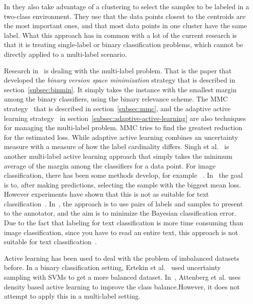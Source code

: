 In \cite{nguyen2004active} they also take advantage of a clustering to select the samples to be labeled in a two-class environment.
They use that the data points closest to the centroids are the most important ones, and that most data points in one cluster have the same label.
What this approach has in common with a lot of the current research is that it is treating single-label or binary classification problems, which cannot be directly applied to a multi-label scenario.

Research in~\cite{brinker2006active} is dealing with the multi-label problem.
That is the paper that developed the \textit{binary version space minimization} strategy that is described in section~\ref{subsec:binmin}.
It simply takes the instance with the smallest margin among the binary classifiers, using the binary relevance scheme.
The MMC strategy~\cite{yang2009effective} that is described in section~\ref{subsec:mmc}, and the adaptive active learning strategy~\cite{li2013active} in section~\ref{subsec:adaptive-active-learning} are also techniques for managing the multi-label problem.
MMC tries to find the greatest reduction for the estimated loss.
While adaptive active learning combines an uncertainty measure with a measure of how the label cardinality differs.
Singh et al\@.~\cite{singh2009active} is another multi-label active learning approach that simply takes the minimum average of the margin among the classifiers for a data point.
For image classification, there has been some methods develop, for example ~\cite{li2004multilabel, qi2008two}.
In~\cite{li2004multilabel} the goal is to, after making predictions, selecting the sample with the biggest mean loss.
However experiments have shown that this is not as suitable for text classification~\cite{yang2009effective}.
In~\cite{qi2008two}, the approach is to use pairs of labels and samples to present to the annotator, and the aim is to minimize the Bayesian classification error.
Due to the fact that labeling for text classification is more time consuming than image classification, since you have to read an entire text, this approach is not suitable for text classification~\cite{yang2009effective}.

Active learning has been used to deal with the problem of imbalanced datasets before.
In a binary classification setting, Ertekin et al\@.~\cite{ertekin2007learning} used uncertainty sampling with SVMs to get a more balanced dataset.
In~\cite{attenberg2013class}, Attenberg et al\@. uses density based active learning to improve the class balance.However, it does not attempt to apply this in a multi-label setting.
